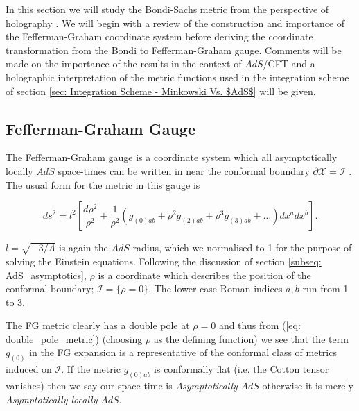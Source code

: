 \documentclass[a4paper,11pt]{article}
\numberwithin{equation}{section}
\begin{document}
In this section we will study the Bondi-Sachs metric from the perspective of holography \cite{Maldacena:1997re, Gubser:1998bc, Witten:1998qj, Henningson:1998gx, Balasubramanian:1999re, deHaro:2000vlm, Skenderis:2000in, Skenderis:2002wp, Papadimitriou:2005ii}. We will begin with a review of the construction and importance of the Fefferman-Graham coordinate system before deriving the coordinate transformation from the Bondi to Fefferman-Graham gauge. Comments will be made on the importance of the results in the context of $AdS$/CFT and a holographic interpretation of the metric functions used in the integration scheme of section \ref{sec: Integration Scheme - Minkowski Vs. $AdS$} will be given.

\subsection{Fefferman-Graham Gauge} \label{subseq: FG_gauge}

The Fefferman-Graham gauge is a coordinate system which all asymptotically locally $AdS$ space-times can be written in near the conformal boundary $\partial \mathcal{X}=\mathscr{I}$ \cite{Skenderis:2002wp}. The usual form for the metric in this gauge is  

\begin{equation} \label{eq: FG gauge}
ds^2=l^2\left[\frac{d\rho^2}{\rho^2}+\frac{1}{\rho^2}(g_{(0)ab}+\rho^2g_{(2)ab}+\rho^3g_{(3)ab}+\ldots)dx^adx^b\right].
\end{equation} 

\noindent $l=\sqrt{-3/\Lambda}$ is again the $AdS$ radius, which we normalised to 1 for the purpose of solving the Einstein equations. Following the discussion of section \ref{subseq: AdS_asymptotics}, $\rho$ is a coordinate which describes the position of the conformal boundary;  $\mathscr{I}=\{ \rho = 0 \}$. The lower case Roman indices $a,b$ run from 1 to 3. \par

The FG metric clearly has a double pole at $\rho=0$ and thus from (\ref{eq: double_pole_metric}) (choosing $\rho$ as the defining function) we see that the term $g_{(0)}$ in the FG expansion is a representative of the conformal class of metrics induced on $\mathscr{I}$. If the metric $g_{(0)ab}$ is conformally flat (i.e. the Cotton tensor vanishes) then we say our space-time is \textit{Asymptotically} $AdS$ otherwise it is merely \textit{Asymptotically locally} $AdS$. \par
\end{document}
